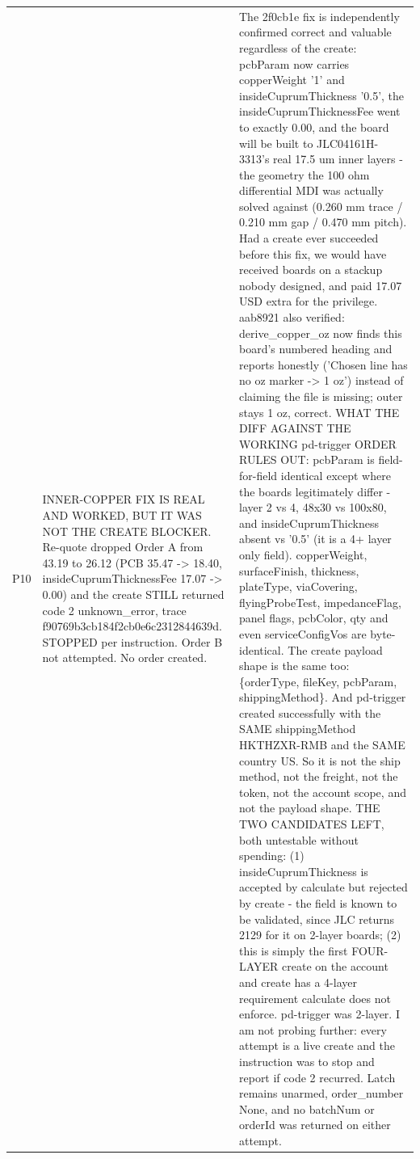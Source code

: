 \documentclass[11pt,a4paper]{article}
\begin{document}
{\begin{longtable}{lp{5.2cm}p{7.2cm}}
P10 & INNER-COPPER FIX IS REAL AND WORKED, BUT IT WAS NOT THE CREATE BLOCKER. Re-quote dropped Order A from 43.19 to 26.12 (PCB 35.47 -\textgreater{} 18.40, insideCuprumThicknessFee 17.07 -\textgreater{} 0.00) and the create STILL returned code 2 unknown\_error, trace f90769b3cb184f2cb0e6c2312844639d. STOPPED per instruction. Order B not attempted. No order created. & The 2f0cb1e fix is independently confirmed correct and valuable regardless of the create: pcbParam now carries copperWeight '1' and insideCuprumThickness '0.5', the insideCuprumThicknessFee went to exactly 0.00, and the board will be built to JLC04161H-3313's real 17.5 um inner layers - the geometry the 100 ohm differential MDI was actually solved against (0.260 mm trace / 0.210 mm gap / 0.470 mm pitch). Had a create ever succeeded before this fix, we would have received boards on a stackup nobody designed, and paid 17.07 USD extra for the privilege. aab8921 also verified: derive\_copper\_oz now finds this board's numbered heading and reports honestly ('Chosen line has no oz marker -\textgreater{} 1 oz') instead of claiming the file is missing; outer stays 1 oz, correct. WHAT THE DIFF AGAINST THE WORKING pd-trigger ORDER RULES OUT: pcbParam is field-for-field identical except where the boards legitimately differ - layer 2 vs 4, 48x30 vs 100x80, and insideCuprumThickness absent vs '0.5' (it is a 4+ layer only field). copperWeight, surfaceFinish, thickness, plateType, viaCovering, flyingProbeTest, impedanceFlag, panel flags, pcbColor, qty and even serviceConfigVos are byte-identical. The create payload shape is the same too: \{orderType, fileKey, pcbParam, shippingMethod\}. And pd-trigger created successfully with the SAME shippingMethod HKTHZXR-RMB and the SAME country US. So it is not the ship method, not the freight, not the token, not the account scope, and not the payload shape. THE TWO CANDIDATES LEFT, both untestable without spending: (1) insideCuprumThickness is accepted by calculate but rejected by create - the field is known to be validated, since JLC returns 2129 for it on 2-layer boards; (2) this is simply the first FOUR-LAYER create on the account and create has a 4-layer requirement calculate does not enforce. pd-trigger was 2-layer. I am not probing further: every attempt is a live create and the instruction was to stop and report if code 2 recurred. Latch remains unarmed, order\_number None, and no batchNum or orderId was returned on either attempt. \\

\end{longtable}}
\end{document}
